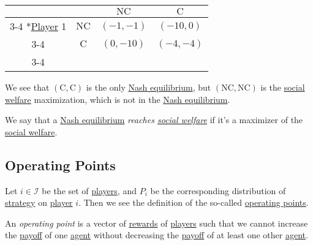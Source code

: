 \begin{prev}
\begin{itemize}
\begin{table}[H]
\begin{tabular}{cc|c|c|}
				                                                     & \multicolumn{1}{c}{} & \multicolumn{1}{c}{$\mathrm{NC}$}                   & \multicolumn{1}{c}{$\mathrm{C}$} \\\cline{3-4}
				      \multirow{2}*{\hyperref[def:player]{Player} 1} & $\mathrm{NC}$        & $(-1, -1)$                                          & $(-10, 0)$                       \\\cline{3-4}
				                                                     & $\mathrm{C}$         & $(0, -10)$                                          & $(-4, -4)$                       \\\cline{3-4}
			      \end{tabular}
		      \end{table}
		      We see that \((\mathrm{C} , \mathrm{C} )\) is the only \hyperref[def:Nash-equilibrium]{Nash equilibrium}, but \((\mathrm{NC}, \mathrm{NC} )\) is the \hyperref[def:social-welfare]{social welfare} maximization, which is not in the \hyperref[def:Nash-equilibrium]{Nash equilibrium}.
	\end{itemize}
\end{prev}

\begin{remark}
	We say that a \hyperref[def:Nash-equilibrium]{Nash equilibrium} \emph{reaches \hyperref[def:social-welfare]{social welfare}} if it's a maximizer of the \hyperref[def:social-welfare]{social welfare}.
\end{remark}

\subsection{Operating Points}
Let \(i\in \mathcal{I} \) be the set of \hyperref[def:player]{players}, and \(P_{i}\) be the corresponding distribution of \hyperref[def:mixed-strategy]{strategy} on \hyperref[def:player]{player} \(i\). Then we see the definition of the so-called \hyperref[def:operating-point]{operating points}.

\begin{definition}\label{def:operating-point}
	An \emph{operating point} is a vector of \hyperref[def:reward]{rewards} of \hyperref[def:player]{players} such that we cannot increase the \hyperref[def:reward]{payoff} of one \hyperref[def:player]{agent} without decreasing the \hyperref[def:reward]{payoff} of at least one other \hyperref[def:player]{agent}.
\end{definition}

